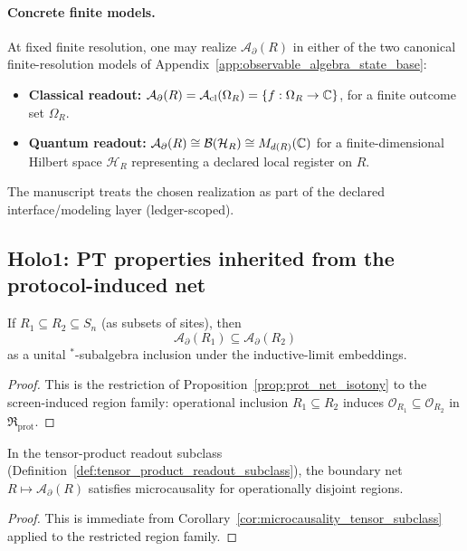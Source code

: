 \paragraph{Concrete finite models.}
\InterfaceTag At fixed finite resolution, one may realize $\mathcal{A}_{\partial}(R)$ in either of the two
canonical finite-resolution models of Appendix~\ref{app:observable_algebra_state_base}:
\begin{itemize}
\item \textbf{Classical readout:} $\mathcal{A}_{\partial}(R)=\mathcal{A}_{\mathrm{cl}}(\Omega_R)=\{f:\Omega_R\to\mathbb{C}\}$,
for a finite outcome set $\Omega_R$.
\item \textbf{Quantum readout:} $\mathcal{A}_{\partial}(R)\cong \mathcal{B}(\mathcal{H}_R)\cong M_{d(R)}(\mathbb{C})$
for a finite-dimensional Hilbert space $\mathcal{H}_R$ representing a declared local register on $R$.
\end{itemize}
The manuscript treats the chosen realization as part of the declared interface/modeling layer (ledger-scoped).

\subsection{Holo1: PT properties inherited from the protocol-induced net}
\label{subsec:holo1_pt_properties}

\begin{proposition}
\label{prop:holo_boundary_isotony}
\MathTag If $R_1\subseteq R_2\subseteq S_n$ (as subsets of sites), then
\[
\mathcal{A}_{\partial}(R_1)\subseteq \mathcal{A}_{\partial}(R_2)
\]
as a unital $^\ast$-subalgebra inclusion under the inductive-limit embeddings.
\end{proposition}
\begin{proof}
This is the restriction of Proposition~\ref{prop:prot_net_isotony} to the screen-induced region family:
operational inclusion $R_1\subseteq R_2$ induces $\mathcal{O}_{R_1}\subseteq \mathcal{O}_{R_2}$ in $\mathfrak{R}_{\mathrm{prot}}$.
\end{proof}

\begin{corollary}
\label{cor:holo_boundary_microcausality_tensor_subclass}
\MathTag In the tensor-product readout subclass (Definition~\ref{def:tensor_product_readout_subclass}),
the boundary net $R\mapsto\mathcal{A}_{\partial}(R)$ satisfies microcausality for operationally disjoint regions.
\end{corollary}
\begin{proof}
This is immediate from Corollary~\ref{cor:microcausality_tensor_subclass} applied to the restricted region family.
\end{proof}

